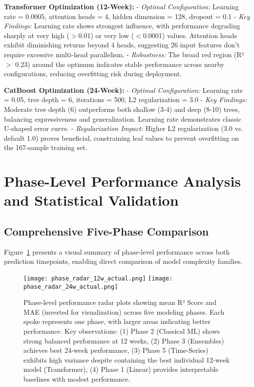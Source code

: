 \documentclass[conference]{IEEEtran}
\begin{document}
\textbf{Transformer Optimization (12-Week):}
- \textit{Optimal Configuration:} Learning rate = 0.0005, attention heads = 4, hidden dimension = 128, dropout = 0.1
- \textit{Key Findings:} Learning rate shows strongest influence, with performance degrading sharply at very high ($>$0.01) or very low ($<$0.0001) values. Attention heads exhibit diminishing returns beyond 4 heads, suggesting 26 input features don't require excessive multi-head parallelism.
- \textit{Robustness:} The broad red region (R² $>$ 0.23) around the optimum indicates stable performance across nearby configurations, reducing overfitting risk during deployment.

\textbf{CatBoost Optimization (24-Week):}
- \textit{Optimal Configuration:} Learning rate = 0.05, tree depth = 6, iterations = 500, L2 regularization = 3.0
- \textit{Key Findings:} Moderate tree depth (6) outperforms both shallow (3-4) and deep (8-10) trees, balancing expressiveness and generalization. Learning rate demonstrates classic U-shaped error curve.
- \textit{Regularization Impact:} Higher L2 regularization (3.0 vs. default 1.0) proves beneficial, constraining leaf values to prevent overfitting on the 167-sample training set.



\section{Phase-Level Performance Analysis and Statistical Validation}

\subsection{Comprehensive Five-Phase Comparison}

Figure~\ref{fig:phase_radar} presents a visual summary of phase-level performance across both prediction timepoints, enabling direct comparison of model complexity families.


\begin{figure}[h]
    \centering
    \texttt{[image: phase\_radar\_12w\_actual.png]}
    \texttt{[image: phase\_radar\_24w\_actual.png]}
    \caption{Phase-level performance radar plots showing mean R² Score and MAE (inverted for visualization) across five modeling phases. Each spoke represents one phase, with larger areas indicating better performance. Key observations: (1) Phase 2 (Classical ML) shows strong balanced performance at 12 weeks, (2) Phase 3 (Ensembles) achieves best 24-week performance, (3) Phase 5 (Time-Series) exhibits high variance despite containing the best individual 12-week model (Transformer), (4) Phase 1 (Linear) provides interpretable baselines with modest performance.}
    \label{fig:phase_radar}
\end{figure}
    
\end{document}
